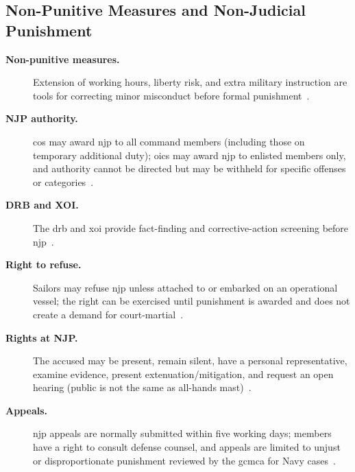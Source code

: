 \documentclass[../main.tex]{subfiles}
\begin{document}
\subsection{Non-Punitive Measures and Non-Judicial Punishment}
\begin{description}
  \item[\textbf{Non-punitive measures.}] Extension of working hours, liberty risk, and extra military instruction are tools for correcting minor misconduct before formal punishment~\autocite{edo-5-1-1-naval-justice-standards-2025}.
  \item[\textbf{NJP authority.}] \acp{co} may award \ac{njp} to all command members (including those on temporary additional duty); \acp{oic} may award \ac{njp} to enlisted members only, and authority cannot be directed but may be withheld for specific offenses or categories~\autocite{edo-5-1-1-naval-justice-standards-2025}.
  \item[\textbf{DRB and XOI.}] The \ac{drb} and \ac{xoi} provide fact-finding and corrective-action screening before \ac{njp}~\autocite{edo-5-1-1-naval-justice-standards-2025}.
  \item[\textbf{Right to refuse.}] Sailors may refuse \ac{njp} unless attached to or embarked on an operational vessel; the right can be exercised until punishment is awarded and does not create a demand for court-martial~\autocite{edo-5-1-1-naval-justice-standards-2025}.
  \item[\textbf{Rights at NJP.}] The accused may be present, remain silent, have a personal representative, examine evidence, present extenuation/mitigation, and request an open hearing (public is not the same as all-hands mast)~\autocite{edo-5-1-1-naval-justice-standards-2025}.
  \item[\textbf{Appeals.}] \ac{njp} appeals are normally submitted within five working days; members have a right to consult defense counsel, and appeals are limited to unjust or disproportionate punishment reviewed by the \ac{gcmca} for Navy cases~\autocite{edo-5-1-1-naval-justice-standards-2025}.
\end{description}
\end{document}
